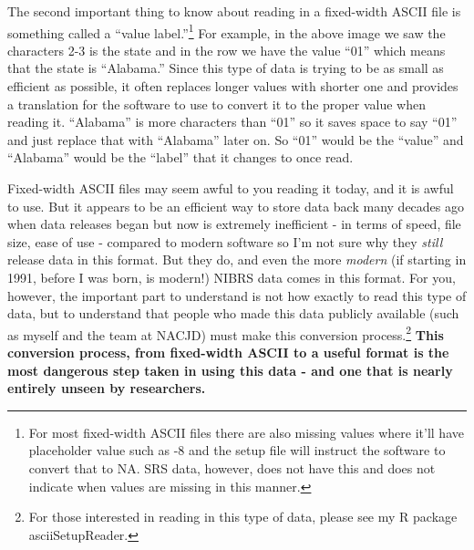 \documentclass[
]{krantz}
\begin{document}
The second important thing to know about reading in a
fixed-width ASCII file is something called a ``value
label.''\footnote{For most fixed-width ASCII files there are
  also missing values where it'll have placeholder value
  such as -8 and the setup file will instruct the software
  to convert that to NA. SRS data, however, does not have
  this and does not indicate when values are missing in this
  manner.} For example, in the above image we saw the
characters 2-3 is the state and in the row we have the value
``01'' which means that the state is ``Alabama.'' Since this
type of data is trying to be as small as efficient as
possible, it often replaces longer values with shorter one
and provides a translation for the software to use to
convert it to the proper value when reading it. ``Alabama''
is more characters than ``01'' so it saves space to say
``01'' and just replace that with ``Alabama'' later on. So
``01'' would be the ``value'' and ``Alabama'' would be the
``label'' that it changes to once read.

Fixed-width ASCII files may seem awful to you reading it
today, and it is awful to use. But it appears to be an
efficient way to store data back many decades ago when data
releases began but now is extremely inefficient - in terms
of speed, file size, ease of use - compared to modern
software so I'm not sure why they \emph{still} release data
in this format. But they do, and even the more \emph{modern}
(if starting in 1991, before I was born, is modern!) NIBRS
data comes in this format. For you, however, the important
part to understand is not how exactly to read this type of
data, but to understand that people who made this data
publicly available (such as myself and the team at NACJD)
must make this conversion process.\footnote{For those
  interested in reading in this type of data, please see my
  R package asciiSetupReader.} \textbf{This conversion
process, from fixed-width ASCII to a useful format is the
most dangerous step taken in using this data - and one that
is nearly entirely unseen by researchers.}
\end{document}
